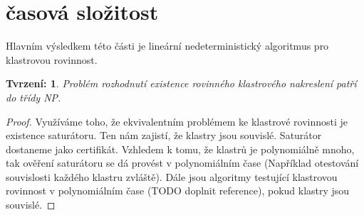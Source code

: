 \documentclass[12pt,a4report]{report}
\newtheorem{tvr}{Tvrzení: }[chapter]
\begin{document}
\section{časová složitost}
Hlavním výsledkem této části je lineární nedeterministický algoritmus pro klastrovou rovinnost.
\begin{tvr}
Problém rozhodnutí existence rovinného klastrového nakreslení patří do třídy NP.
\end{tvr}
\begin{proof}
Využíváme toho, že ekvivalentním problémem ke klastrové rovinnosti je existence saturátoru. Ten nám zajistí, že klastry jsou souvislé. Saturátor dostaneme jako certifikát. Vzhledem k tomu, že klastrů je polynomiálně mnoho, tak ověření saturátoru se dá provést  v polynomiálním čase (Například otestování souvislosti každého klastru zvláště). Dále jsou algoritmy testující klastrovou rovinnost v polynomiálním čase (TODO doplnit reference), pokud klastry jsou souvislé. 
\end{proof}
\end{document}

